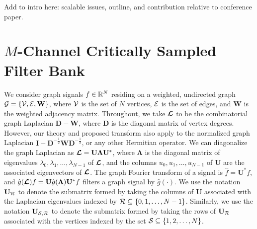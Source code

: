 \documentclass[journal, 10pt]{IEEEtran}
\begin{document}
{\color{red} Add to intro here: scalable issues, outline, and contribution relative to conference paper.}


\section{$M$-Channel Critically Sampled Filter Bank}
We consider graph signals $f \in \mathbb{R}^N$ residing on a weighted, undirected graph ${\mathcal{G}}=\{{\mathcal{V}},{\mathcal{E}},\mathbf{W}\}$, where ${\mathcal{V}}$ is the set of $N$ vertices, ${\mathcal{E}}$ is the set of edges, and $\mathbf{W}$ is the weighted adjacency matrix. 
Throughout, we take $\boldsymbol{\mathcal{L}}$ to be the combinatorial graph Laplacian $\mathbf{D}-\mathbf{W}$, where $\mathbf{D}$ is the diagonal matrix of vertex degrees. However, our theory and proposed transform also apply to the normalized graph Laplacian $\mathbf{I}-\mathbf{D}^{-\frac{1}{2}}\mathbf{W}\mathbf{D}^{-\frac{1}{2}}$, or any other Hermitian operator. We can diagonalize the graph Laplacian as $\boldsymbol{\mathcal{L}}=\mathbf{U}{\boldsymbol \Lambda}\mathbf{U}^{*}$, where ${\boldsymbol \Lambda}$ is the diagonal matrix of eigenvalues $\lambda_0,\lambda_1,\ldots,\lambda_{N-1}$ of $\boldsymbol{\mathcal{L}}$, and the columns $u_0,u_1,\ldots,u_{N-1}$ of $\mathbf{U}$ are the associated eigenvectors of $\boldsymbol{\mathcal{L}}$. The graph Fourier transform of a signal is $\hat{f}=\mathbf{U}^{*}f$, and $\hat{g}(\boldsymbol{\mathcal{L}})f=\mathbf{U}\hat{g}({\boldsymbol \Lambda})\mathbf{U}^{*}f$ filters a graph signal by $\hat{g}(\cdot)$. We use the notation $\mathbf{U}_{{\cal R}}$ to denote the submatrix formed by taking the columns of $\mathbf{U}$ associated with the Laplacian eigenvalues indexed by ${\cal R} \subseteq \{0,1,\ldots,N-1\}$. Similarly, we use the notation $\mathbf{U}_{{\cal S},{\cal R}}$ to denote the submatrix  formed by taking the rows of $\mathbf{U}_{{\cal R}}$ associated with the vertices indexed by the set ${\cal S} \subseteq \{1,2,\ldots,N\}$.
\end{document}
